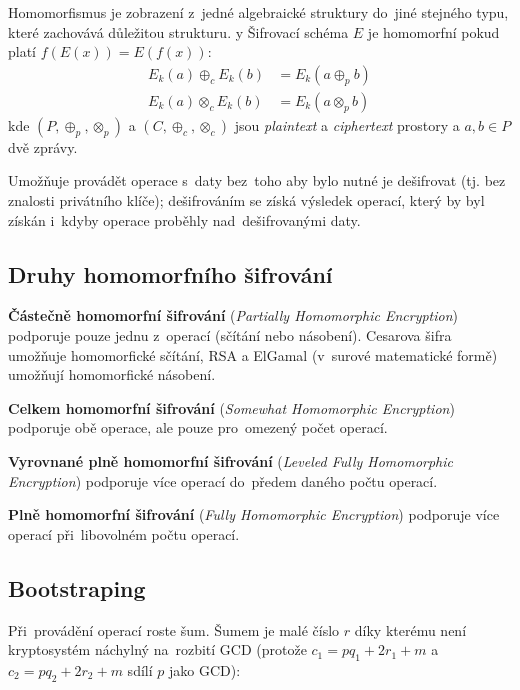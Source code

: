 Homomorfismus je zobrazení z~jedné algebraické struktury do~jiné stejného typu, které zachovává důležitou strukturu.
y
Šifrovací schéma $E$ je homomorfní pokud platí $f(E(x)) = E(f(x))$:
\begin{align*}
    E_k(a) \oplus_c E_k(b) &= E_k (a \oplus_p b)
    \\
    E_k(a) \otimes_c E_k(b) &= E_k(a \otimes_p b)
\end{align*}
\noindent
kde $(P, \oplus_p, \otimes_p)$ a $(C, \oplus_c, \otimes_c)$ jsou \emph{plaintext} a \emph{ciphertext} prostory a $a, b \in P$ dvě zprávy.

Umožňuje provádět operace s~daty bez~toho aby bylo nutné je dešifrovat (tj. bez znalosti privátního klíče); dešifrováním se získá výsledek operací, který by byl získán i~kdyby operace proběhly nad~dešifrovanými daty.

\subsection{Druhy homomorfního šifrování}

\textbf{Částečně homomorfní šifrování} (\emph{Partially Homomorphic Encryption}) podporuje pouze jednu z~operací (sčítání nebo násobení).
Cesarova šifra umožňuje homomorfické sčítání, RSA a ElGamal (v~surové matematické formě) umožňují homomorfické násobení.

\textbf{Celkem homomorfní šifrování} (\emph{Somewhat Homomorphic Encryption}) podporuje obě operace, ale pouze pro~omezený počet operací.

\textbf{Vyrovnané plně homomorfní šifrování} (\emph{Leveled Fully Homomorphic Encryption}) podporuje více operací do~předem daného počtu operací.

\textbf{Plně homomorfní šifrování} (\emph{Fully Homomorphic Encryption}) podporuje více operací při~libovolném počtu operací.

\subsection{Bootstraping}

Při~provádění operací roste šum. Šumem je malé číslo $r$ díky kterému není kryptosystém náchylný na~rozbití GCD (protože $c_1 = pq_1 + 2r_1 + m$ a $c_2 = pq_2 + 2r_2 + m$ sdílí $p$ jako GCD):

